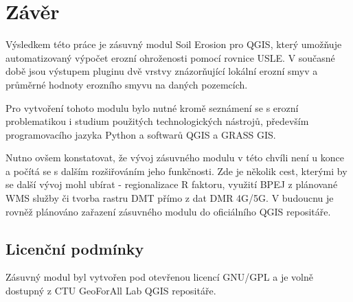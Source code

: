 \chapter{Závěr}

Výsledkem této práce je zásuvný modul Soil Erosion pro QGIS, který
umožňuje automatizovaný výpočet erozní ohroženosti pomocí rovnice
USLE. V současné době jsou výstupem pluginu dvě vrstvy znázorňující
lokální erozní smyv a průměrné hodnoty erozního smyvu na daných
pozemcích.

Pro vytvoření tohoto modulu bylo nutné kromě seznámení se s erozní
problematikou i studium použitých technologických nástrojů, především
programovacího jazyka Python a softwarů QGIS a GRASS GIS.

Nutno ovšem konstatovat, že vývoj zásuvného modulu v této chvíli není
u konce a počítá se s dalším rozšiřováním jeho funkčnosti. Zde je
několik cest, kterými by se další vývoj mohl ubírat - regionalizace R
faktoru, využití BPEJ z plánované WMS služby či tvorba rastru DMT
přímo z dat DMR 4G/5G. V budoucnu je rovněž plánováno zařazení
zásuvného modulu do oficiálního QGIS repositáře.

\section{Licenční podmínky}

Zásuvný modul byl vytvořen pod otevřenou licencí GNU/GPL a je volně
dostupný z CTU GeoForAll Lab QGIS repositáře.
